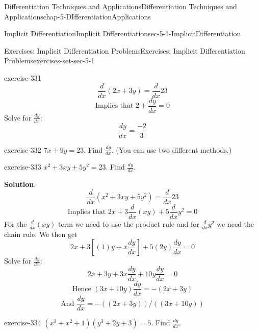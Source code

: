 \documentclass[oneside,10pt,]{book}
\numberwithin{equation}{section}
\begin{document}
\begin{chapterptx}{Differentiation Techniques and Applications}{}{Differentiation Techniques and Applications}{}{}{chap-5-DIfferentiationApplications}
\begin{sectionptx}{Implicit Differentiation}{}{Implicit Differentiation}{}{}{sec-5-1-ImplicitDifferentiation}
\begin{exercises-subsection-numberless}{Exercises: Implicit Differentiation Problems}{}{Exercises: Implicit Differentiation Problems}{}{}{exercises-set-sec-5-1}
\begin{divisionexercise}{1}{}{}{exercise-331}
%
\begin{equation*}
\frac{d}{dx}  (2x+3y )= \frac{d}{dx}  23
\end{equation*}
%
\begin{equation*}
\text{Implies that }2+  \frac{dy}{dx} =0
\end{equation*}
\hypertarget{p-1901}{}%
Solve for \(\frac{dy}{dx}\):%
%
\begin{equation*}
\frac{dy}{dx}  =\frac{-2}{3}
\end{equation*}
\end{divisionexercise}%
\begin{divisionexercise}{2}{}{}{exercise-332}%
\hypertarget{p-1902}{}%
\(7x+9y=23\).	Find \(\frac{dy}{dx}\).  (You can use two different methods.)%
\end{divisionexercise}%
\begin{divisionexercise}{3}{}{}{exercise-333}%
\hypertarget{p-1903}{}%
\(x^2+3xy+5y^2=23\).	Find \(\frac{dy}{dx}\).%
\par\smallskip%
\noindent\textbf{Solution}.\hypertarget{solution-167}{}\quad%
%
\begin{equation*}
\frac{d}{dx}  (x^2+3xy+5y^2 )= \frac{d}{dx}  23
\end{equation*}
%
\begin{equation*}
\text{Implies that }2x+3  \frac{d}{dx} (xy)+5  \frac{d}{dx}  y^2=0
\end{equation*}
\hypertarget{p-1904}{}%
For the  \(\frac{d}{dx} (xy)\) term we need to use the product rule and for  \(\frac{d}{dx}  y^2\) we need the chain rule. We then get%
%
\begin{equation*}
2x+3[(1)y+x\frac{dy}{dx}]+5 (2y)\frac{dy}{dx}  =0
\end{equation*}
\hypertarget{p-1905}{}%
Solve for \(\frac{dy}{dx}\):%
%
\begin{equation*}
2x+3y+3x \frac{dy}{dx}+10y \frac{dy}{dx}  =0
\end{equation*}
%
\begin{equation*}
\text{Hence }(3x+10y)  \frac{dy}{dx}  =-(2x+3y)
\end{equation*}
%
\begin{equation*}
\text{And  }\frac{dy}{dx}  =-((2x+3y))/((3x+10y) )
\end{equation*}
\end{divisionexercise}%
\begin{divisionexercise}{4}{}{}{exercise-334}%
\hypertarget{p-1906}{}%
\((x^3+x^2+1)(y^3+2y+3)=5\).	Find \(\frac{dy}{dx}\).%
\end{divisionexercise}%

\end{exercises-subsection-numberless}
\end{sectionptx}
\end{chapterptx}
\end{document}
